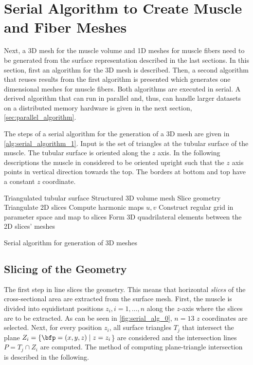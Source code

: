 \section{Serial Algorithm to Create Muscle and Fiber Meshes}\label{sec:ser_alg_meshes}
Next, a 3D mesh for the muscle volume and 1D meshes for muscle fibers need to be generated from the surface representation described in the last sections. In this section, first an algorithm for the 3D mesh is described. Then, a second algorithm that reuses results from the first algorithm is presented which generates one dimensional meshes for muscle fibers. Both algorithms are executed in serial. A derived algorithm that can run in parallel and, thus, can handle larger datasets on a distributed memory hardware is given in the next section, \cref{sec:parallel_algorithm}.

The steps of a serial algorithm for the generation of a 3D mesh are given in \cref{alg:serial_algorithm_1}. Input is the set of triangles at the tubular surface of the muscle. The tubular surface is oriented along the $z$ axis. In the following descriptions the muscle in considered to be oriented upright such that the $z$ axis points in vertical direction towards the top. The borders at bottom and top have a constant $z$ coordinate.
%
\begin{algorithm}
  \begin{algorithmic}[1]%
    \Require Triangulated tubular surface
    \Ensure Structured 3D volume mesh
    \Statex
    \State Slice geometry           \label{alg:1.1}
    \State Triangulate 2D slices      \label{alg:1.2}
    \State Compute harmonic maps $u, v$      \label{alg:1.3}
    \State Construct regular grid in parameter space and map to slices            \label{alg:1.4}
    \State Form 3D quadrilateral elements between the 2D slices’ meshes   \label{alg:1.5}
    \EndProcedure
  \end{algorithmic}%
  \caption{Serial algorithm for generation of 3D meshes}%
  \label{alg:serial_algorithm_1}%
\end{algorithm}%

\subsection{Slicing of the Geometry}\label{sec:slicing_of_the_geometry}
The first step in line  slices the geometry. This means that horizontal \emph{slices} of the cross-sectional area are extracted from the surface mesh. First, the muscle is divided into equidistant positions $z_i, i=1,\dots,n$ along the $z$-axis where the slices are to be extracted. As can be seen in \cref{fig:serial_alg_0}, $n=13$ $z$ coordinates are selected. Next, for every position $z_i$, all surface triangles $T_j$ that intersect the plane $Z_i = \{\bfp=(x,y,z) \mid z=z_i$\} are considered and the intersection lines $P = T_j \cap Z_i$ are computed. The method of computing plane-triangle intersection is described in the following.

